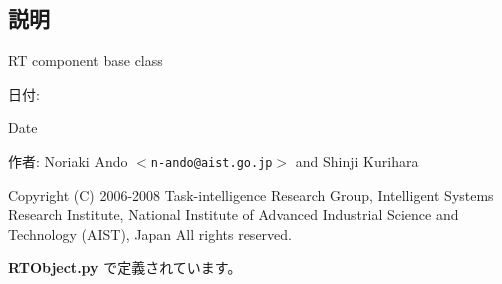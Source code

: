 \subsection{説明}
RT component base class 

\begin{Desc}
\item[日付:]\end{Desc}
\begin{Desc}
\item[Date]\end{Desc}
\begin{Desc}
\item[作者:]Noriaki Ando $<${\tt n-ando@aist.go.jp}$>$ and Shinji Kurihara\end{Desc}
Copyright (C) 2006-2008 Task-intelligence Research Group, Intelligent Systems Research Institute, National Institute of Advanced Industrial Science and Technology (AIST), Japan All rights reserved. 

 {\bf RTObject.py} で定義されています。